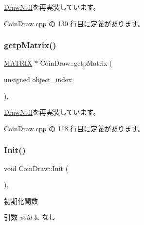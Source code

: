 \mbox{\hyperlink{class_draw_null_aa07d7e89e723b68ec257da0f63d43f70}{Draw\+Null}}を再実装しています。



 Coin\+Draw.\+cpp の 130 行目に定義があります。

\mbox{\label{class_coin_draw_ad8cbbe87f4cf4428214f50492c731f5f}} 
\subsubsection{\texorpdfstring{getp\+Matrix()}{getpMatrix()}}
{\footnotesize\ttfamily \mbox{\hyperlink{_vector3_d_8h_a032295cd9fb1b711757c90667278e744}{M\+A\+T\+R\+IX}} $\ast$ Coin\+Draw\+::getp\+Matrix (\begin{DoxyParamCaption}\item[{unsigned}]{object\+\_\+index }\end{DoxyParamCaption})\hspace{0.3cm}{\ttfamily [override]}, {\ttfamily [virtual]}}



\mbox{\hyperlink{class_draw_null_a001901c340671106a33d44b9d4aef4c4}{Draw\+Null}}を再実装しています。



 Coin\+Draw.\+cpp の 118 行目に定義があります。

\mbox{\label{class_coin_draw_ad0f5da5cfb896541fd59b1ab4a8593d1}} 
\subsubsection{\texorpdfstring{Init()}{Init()}}
{\footnotesize\ttfamily void Coin\+Draw\+::\+Init (\begin{DoxyParamCaption}{ }\end{DoxyParamCaption})\hspace{0.3cm}{\ttfamily [override]}, {\ttfamily [virtual]}}



初期化関数 


\begin{DoxyParams}{引数}
{\em void} & なし \\
\hline
\end{DoxyParams}

